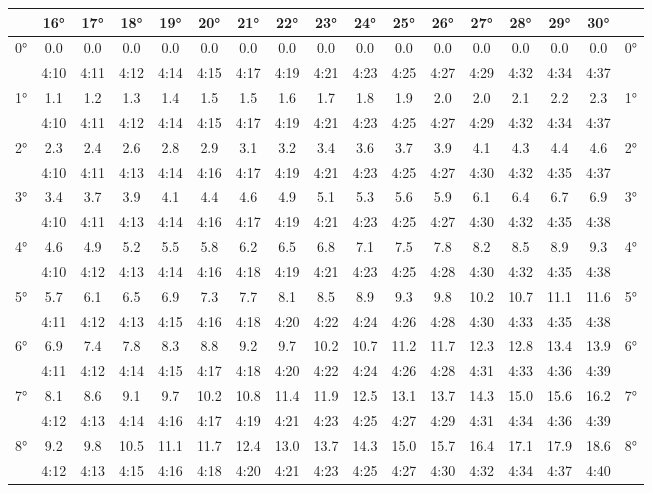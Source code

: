 \begin{footnotesize}\begin{tabular}{c || c | c | c | c | c | c | c | c | c | c | c | c | c | c | c || c}
		\space &16°&17°&18°&19°&20°&21°&22°&23°&24°&25°&26°&27°&28°&29°&30°\\\hline\hline
		\multirow{2}{*}{0°}&0.0&0.0&0.0&0.0&0.0&0.0&0.0&0.0&0.0&0.0&0.0&0.0&0.0&0.0&0.0&\multirow{2}{*}{0°}\\ \space&4:10&4:11&4:12&4:14&4:15&4:17&4:19&4:21&4:23&4:25&4:27&4:29&4:32&4:34&4:37&\space\\\hline
		\multirow{2}{*}{1°}&1.1&1.2&1.3&1.4&1.5&1.5&1.6&1.7&1.8&1.9&2.0&2.0&2.1&2.2&2.3&\multirow{2}{*}{1°}\\ \space&4:10&4:11&4:12&4:14&4:15&4:17&4:19&4:21&4:23&4:25&4:27&4:29&4:32&4:34&4:37&\space\\\hline
		\multirow{2}{*}{2°}&2.3&2.4&2.6&2.8&2.9&3.1&3.2&3.4&3.6&3.7&3.9&4.1&4.3&4.4&4.6&\multirow{2}{*}{2°}\\ \space&4:10&4:11&4:13&4:14&4:16&4:17&4:19&4:21&4:23&4:25&4:27&4:30&4:32&4:35&4:37&\space\\\hline
		\multirow{2}{*}{3°}&3.4&3.7&3.9&4.1&4.4&4.6&4.9&5.1&5.3&5.6&5.9&6.1&6.4&6.7&6.9&\multirow{2}{*}{3°}\\ \space&4:10&4:11&4:13&4:14&4:16&4:17&4:19&4:21&4:23&4:25&4:27&4:30&4:32&4:35&4:38&\space\\\hline
		\multirow{2}{*}{4°}&4.6&4.9&5.2&5.5&5.8&6.2&6.5&6.8&7.1&7.5&7.8&8.2&8.5&8.9&9.3&\multirow{2}{*}{4°}\\ \space&4:10&4:12&4:13&4:14&4:16&4:18&4:19&4:21&4:23&4:25&4:28&4:30&4:32&4:35&4:38&\space\\\hline
		\multirow{2}{*}{5°}&5.7&6.1&6.5&6.9&7.3&7.7&8.1&8.5&8.9&9.3&9.8&10.2&10.7&11.1&11.6&\multirow{2}{*}{5°}\\ \space&4:11&4:12&4:13&4:15&4:16&4:18&4:20&4:22&4:24&4:26&4:28&4:30&4:33&4:35&4:38&\space\\\hline
		\multirow{2}{*}{6°}&6.9&7.4&7.8&8.3&8.8&9.2&9.7&10.2&10.7&11.2&11.7&12.3&12.8&13.4&13.9&\multirow{2}{*}{6°}\\ \space&4:11&4:12&4:14&4:15&4:17&4:18&4:20&4:22&4:24&4:26&4:28&4:31&4:33&4:36&4:39&\space\\\hline
		\multirow{2}{*}{7°}&8.1&8.6&9.1&9.7&10.2&10.8&11.4&11.9&12.5&13.1&13.7&14.3&15.0&15.6&16.2&\multirow{2}{*}{7°}\\ \space&4:12&4:13&4:14&4:16&4:17&4:19&4:21&4:23&4:25&4:27&4:29&4:31&4:34&4:36&4:39&\space\\\hline
		\multirow{2}{*}{8°}&9.2&9.8&10.5&11.1&11.7&12.4&13.0&13.7&14.3&15.0&15.7&16.4&17.1&17.9&18.6&\multirow{2}{*}{8°}\\ \space&4:12&4:13&4:15&4:16&4:18&4:20&4:21&4:23&4:25&4:27&4:30&4:32&4:34&4:37&4:40&\space\\\hline

\end{tabular}
\end{footnotesize}
